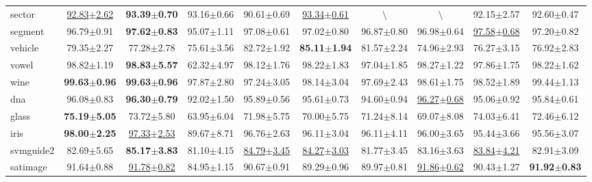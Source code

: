 \documentclass{article}
\begin{document}
\begin{table*}[t]
\begin{tabular*}{\linewidth}{@{\extracolsep{-0.25cm}}lccccccccc}
sector             &\underline{92.83$\pm$2.62} & \textbf{93.39$\pm$0.70}  &93.16$\pm$0.66      &90.61$\pm$0.69            &\underline{93.34$\pm$0.61}                    &$\setminus$                         &$\setminus$                   &92.15$\pm$2.57            &92.60$\pm$0.47\\
segment            &96.79$\pm$0.91             & \textbf{97.62$\pm$0.83}  &95.07$\pm$1.11      &97.08$\pm$0.61            &97.02$\pm$0.80       &96.87$\pm$0.80    &96.98$\pm$0.64             &\underline{97.58$\pm$0.68}&97.20$\pm$0.82\\
vehicle            &79.35$\pm$2.27             & 77.28$\pm$2.78           &75.61$\pm$3.56      &82.72$\pm$1.92            &\textbf{85.11$\pm$1.94}       &81.57$\pm$2.24    &74.96$\pm$2.93             &76.27$\pm$3.15            &76.92$\pm$2.83\\
vowel              &98.82$\pm$1.19             &\textbf{98.83$\pm$5.57}   &62.32$\pm$4.97      &98.12$\pm$1.76            &98.22$\pm$1.83       &97.04$\pm$1.85    &98.27$\pm$1.22             &97.86$\pm$1.75            &98.22$\pm$1.62\\
wine               &\textbf{99.63$\pm$0.96}    &\textbf{99.63$\pm$0.96}   &97.87$\pm$2.80      &97.24$\pm$3.05            &98.14$\pm$3.04       &97.69$\pm$2.43    &98.61$\pm$1.75             &98.52$\pm$1.89            &99.44$\pm$1.13            \\
dna                &96.08$\pm$0.83             &\textbf{96.30$\pm$0.79}   &92.02$\pm$1.50      &95.89$\pm$0.56            &95.61$\pm$0.73       &94.60$\pm$0.94    &\underline{96.27$\pm$0.68}             &95.06$\pm$0.92            &95.84$\pm$0.61\\
glass              &\textbf{75.19$\pm$5.05}    & 73.72$\pm$5.80           &63.95$\pm$6.04      &71.98$\pm$5.75            &70.00$\pm$5.75       &71.24$\pm$8.14    &69.07$\pm$8.08             &74.03$\pm$6.41            &72.46$\pm$6.12\\
iris               &\textbf{98.00$\pm$2.25}    &\underline{97.33$\pm$2.53}&89.67$\pm$8.71      &96.76$\pm$2.63            &96.11$\pm$3.04       &96.11$\pm$4.11    &96.00$\pm$3.65             &95.44$\pm$3.66            &95.56$\pm$3.07\\
svmguide2          &82.69$\pm$5.65             &\textbf{85.17$\pm$3.83}   &81.10$\pm$4.15      &\underline{84.79$\pm$3.45}&\underline{84.27$\pm$3.03}  &81.77$\pm$3.45    &83.16$\pm$3.63             &\underline{83.84$\pm$4.21}            &82.91$\pm$3.09\\
satimage           &91.64$\pm$0.88             &\underline{91.78$\pm$0.82}&84.95$\pm$1.15      &90.67$\pm$0.91            &89.29$\pm$0.96       &89.97$\pm$0.81    &\underline{91.86$\pm$0.62} &90.43$\pm$1.27            &\textbf{91.92$\pm$0.83}\\
\bottomrule
\end{tabular*}
\vspace{-0.6cm}
\end{table*}
\end{document}
